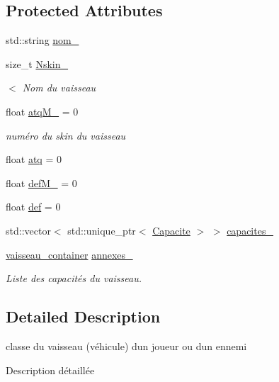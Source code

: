 \subsection*{Protected Attributes}
\begin{DoxyCompactItemize}
\item 
std\+::string \mbox{\hyperlink{class_vaisseau_a2abb8ab70479bc486d19b563dddbe825}{nom\+\_\+}}
\item 
size\+\_\+t \mbox{\hyperlink{class_vaisseau_a45365e5a9abdc0a5ea990fa6c36f224b}{Nskin\+\_\+}}
\begin{DoxyCompactList}\small\item\em $<$ Nom du vaisseau \end{DoxyCompactList}\item 
float \mbox{\hyperlink{class_vaisseau_aa2bbb11262b446da2855d90833e16297}{atq\+M\+\_\+}} = 0
\begin{DoxyCompactList}\small\item\em numéro du skin du vaisseau \end{DoxyCompactList}\item 
float \mbox{\hyperlink{class_vaisseau_a1a64494b34aea8818a2a5f14adfcdd26}{atq}} = 0
\item 
float \mbox{\hyperlink{class_vaisseau_a286c951036adbdfe3deca442fc72160a}{def\+M\+\_\+}} = 0
\item 
float \mbox{\hyperlink{class_vaisseau_a98239763c1a44cea172db2cdf5625afe}{def}} = 0
\item 
std\+::vector$<$ std\+::unique\+\_\+ptr$<$ \mbox{\hyperlink{class_capacite}{Capacite}} $>$ $>$ \mbox{\hyperlink{class_vaisseau_af6ca9930eaac09830571679bfe48a390}{capacites\+\_\+}}
\item 
\mbox{\hyperlink{def__type_8h_ad123ed7c93f42c8dd68e4af28b16b639}{vaisseau\+\_\+container}} \mbox{\hyperlink{class_vaisseau_adcb02cf574b4484c2a9f2d0acd648395}{annexes\+\_\+}}
\begin{DoxyCompactList}\small\item\em Liste des capacités du vaisseau. \end{DoxyCompactList}\end{DoxyCompactItemize}


\subsection{Detailed Description}
classe du vaisseau (véhicule) d\textquotesingle{}un joueur ou d\textquotesingle{}un ennemi 

Description détaillée 

